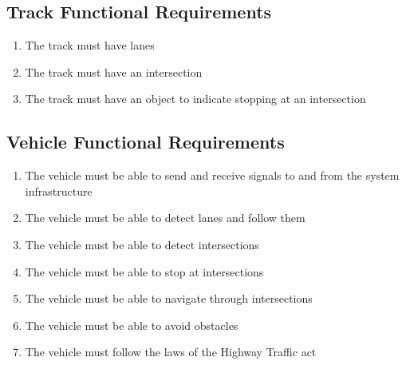 \documentclass [12pt]{article}
\begin{document}
\subsection{\large Track Functional Requirements}
\begin{enumerate}[label=\textbf{T\arabic*:},leftmargin =0.8in]
	\item The track must have lanes
	\item The track must have an intersection
	\item The track must have an object to indicate stopping at an intersection
\end{enumerate}


\subsection{\large Vehicle Functional Requirements}

\begin{minipage}{\textwidth}
\begin{enumerate}[label=\textbf{V\arabic*:}, leftmargin=0.8in]
	
	\item The vehicle must be able to send and receive signals to and from the system infrastructure
	
	\item The vehicle must be able to detect lanes and follow them
    
    \item The vehicle must be able to detect intersections 
    
    \item The vehicle must be able to stop at intersections
    
    \item The vehicle must be able to navigate through intersections
    
    \item The vehicle must be able to avoid obstacles 
    
    \item The vehicle must follow the laws of the Highway Traffic act
\end{enumerate}
\end{minipage}


\end{document}
